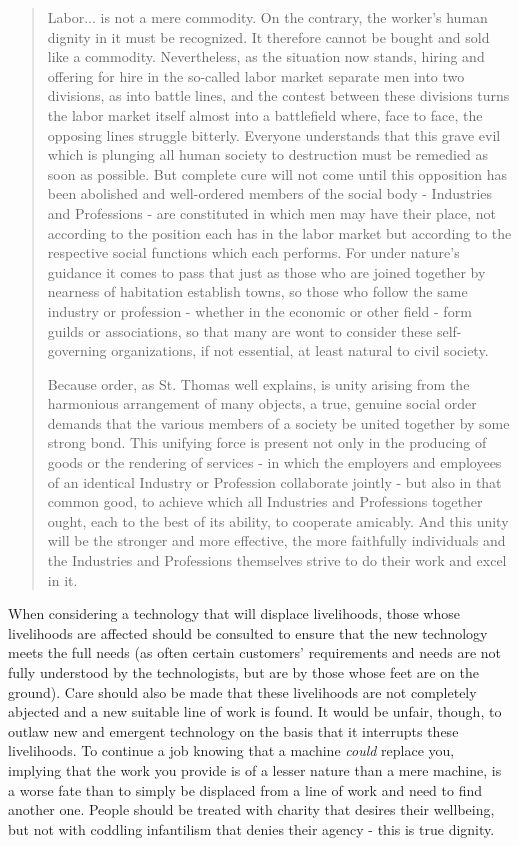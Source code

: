 \documentclass[letterpaper]{article}
\begin{document}
\begin{quote}
  Labor... is not a mere commodity. On the contrary, the worker's human dignity in it must be recognized. It therefore cannot be bought and sold like a commodity. Nevertheless, as the situation now stands, hiring and offering for hire in the so-called labor market separate men into two divisions, as into battle lines, and the contest between these divisions turns the labor market itself almost into a battlefield where, face to face, the opposing lines struggle bitterly. Everyone understands that this grave evil which is plunging all human society to destruction must be remedied as soon as possible. But complete cure will not come until this opposition has been abolished and well-ordered members of the social body - Industries and Professions - are constituted in which men may have their place, not according to the position each has in the labor market but according to the respective social functions which each performs. For under nature's guidance it comes to pass that just as those who are joined together by nearness of habitation establish towns, so those who follow the same industry or profession - whether in the economic or other field - form guilds or associations, so that many are wont to consider these self-governing organizations, if not essential, at least natural to civil society.

  Because order, as St. Thomas well explains, is unity arising from the harmonious arrangement of many objects, a true, genuine social order demands that the various members of a society be united together by some strong bond. This unifying force is present not only in the producing of goods or the rendering of services - in which the employers and employees of an identical Industry or Profession collaborate jointly - but also in that common good, to achieve which all Industries and Professions together ought, each to the best of its ability, to cooperate amicably. And this unity will be the stronger and more effective, the more faithfully individuals and the Industries and Professions themselves strive to do their work and excel in it. 
\end{quote}


When considering a technology that will displace livelihoods, those whose livelihoods are affected should be consulted to ensure that the new technology meets the full needs (as often certain customers' requirements and needs are not fully understood by the technologists, but are by those whose feet are on the ground). Care should also be made that these livelihoods are not completely abjected and a new suitable line of work is found. It would be unfair, though, to outlaw new and emergent technology on the basis that it interrupts these livelihoods. To continue a job knowing that a machine \textit{could} replace you, implying that the work you provide is of a lesser nature than a mere machine, is a worse fate than to simply be displaced from a line of work and need to find another one. People should be treated with charity that desires their wellbeing, but not with coddling infantilism that denies their agency - this is true dignity.
\end{document}
